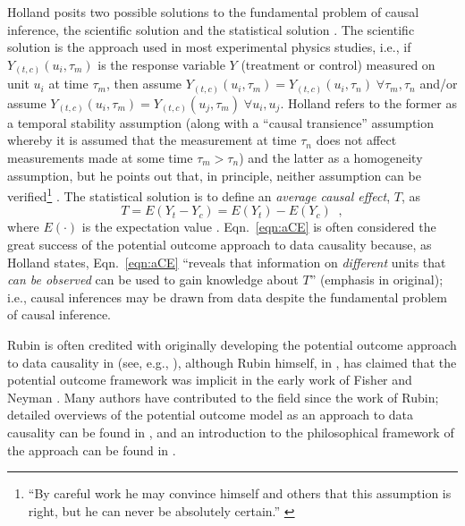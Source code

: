 Holland posits two possible solutions to the fundamental problem of causal inference, the scientific solution and the statistical solution \cite{Holland1986}.  The scientific solution is the approach used in most experimental physics studies, i.e., if $Y_{(t,c)}(u_i,\tau_m)$ is the response variable $Y$ (treatment or control) measured on unit $u_i$ at time $\tau_m$, then assume $Y_{(t,c)}(u_i,\tau_m)=Y_{(t,c)}(u_i,\tau_n)\;\forall\tau_m,\tau_n$ and/or assume $Y_{(t,c)}(u_i,\tau_m)=Y_{(t,c)}(u_j,\tau_m)\;\forall u_i,u_j$.  Holland refers to the former as a temporal stability assumption (along with a ``causal transience'' assumption whereby it is assumed that the measurement at time $\tau_n$ does not affect measurements made at some time $\tau_m>\tau_n$) and the latter as a homogeneity assumption, but he points out that, in principle, neither assumption can be verified\footnote{``By careful work he may convince himself and others that this assumption is right, but he can never be absolutely certain.'' \cite{Holland1986}} \cite{Holland1986}.  The statistical solution is to define an {\em average causal effect}, $T$, as
\begin{equation}
\label{eqn:aCE}
T = E\left(Y_t-Y_c\right) = E\left(Y_t\right)-E\left(Y_c\right)\;\;,
\end{equation}
where $E(\cdot)$ is the expectation value \cite{Holland1986,Morgan2014,Imbens2015}.  Eqn.\ \ref{eqn:aCE} is often considered the great success of the potential outcome approach to data causality because, as Holland states, Eqn.\ \ref{eqn:aCE} ``reveals that information on {\em different} units that {\em can be observed} can be used to gain knowledge about $T$'' \cite{Holland1986} (emphasis in original); i.e., causal inferences may be drawn from data despite the fundamental problem of causal inference.

Rubin is often credited with originally developing the potential outcome approach to data causality in \cite{Rubin1974} (see, e.g., \cite{Holland1986,Morgan2014}), although Rubin himself, in \cite{Rubin1986}, has claimed that the potential outcome framework was implicit in the early work of Fisher \cite{Fisher1960} and Neyman \cite{Neyman1935}.  Many authors have contributed to the field since the work of Rubin; detailed overviews of the potential outcome model as an approach to data causality can be found in \cite{Morgan2014,Imbens2015}, and an introduction to the philosophical framework of the approach can be found in \cite{Illari2014}.

